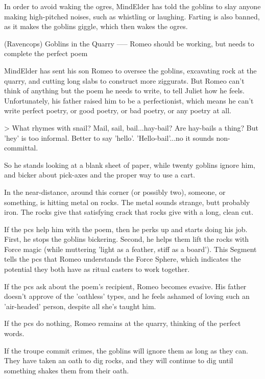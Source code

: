 In order to avoid waking the ogres, \gls{MindElder} has told the goblins to slay anyone making high-pitched noises, such as whistling or laughing.
Farting is also banned, as it makes the goblins giggle, which then wakes the ogres.

(Ravencops) Goblins in the Quarry
-----
{Romeo should be working, but needs to complete the perfect poem}

\Gls{MindElder} has sent his son Romeo to oversee the goblins, excavating rock at the quarry, and cutting long slabs to construct more ziggurats.
But Romeo can't think of anything but the poem he needs to write, to tell Juliet how he feels.
Unfortunately, his father raised him to be a perfectionist, which means he can't write perfect poetry, or good poetry, or bad poetry, or any poetry at all.

> What rhymes with snail?  Mail, sail, bail...hay-bail?  Are hay-bails a thing?  But 'hey' is too informal.  Better to say 'hello'.  'Hello-bail'...no it sounds non-committal.

So he stands looking at a blank sheet of paper, while twenty goblins ignore him, and bicker about pick-axes and the proper way to use a cart.

\begin{boxtext}
  In the near-distance, around this corner (or possibly two), someone, or something, is hitting metal on rocks.
  The metal sounds strange, butt probably iron.
  The rocks give that satisfying crack that rocks give with a long, clean cut.
\end{boxtext}

If the \glspl{pc} help him with the poem,
then he perks up and starts doing his job.
First, he stops the goblins bickering.
Second, he helps them lift the rocks with Force magic (while muttering 'light as a feather, stiff as a board').
This Segment tells the \glspl{pc} that Romeo understands the Force Sphere, which indicates the potential they both have as ritual casters to work together.

If the \glspl{pc} ask about the poem's recipient,
Romeo becomes evasive.
His father doesn't approve of the 'oathless' types, and he feels ashamed of loving such an 'air-headed' person, despite all she's taught him.

If the \glspl{pc} do nothing,
Romeo remains at the quarry, thinking of the perfect words.

If the troupe commit crimes,
the goblins will ignore them as long as they can.
They have taken an oath to dig rocks, and they will continue to dig until something shakes them from their oath.

